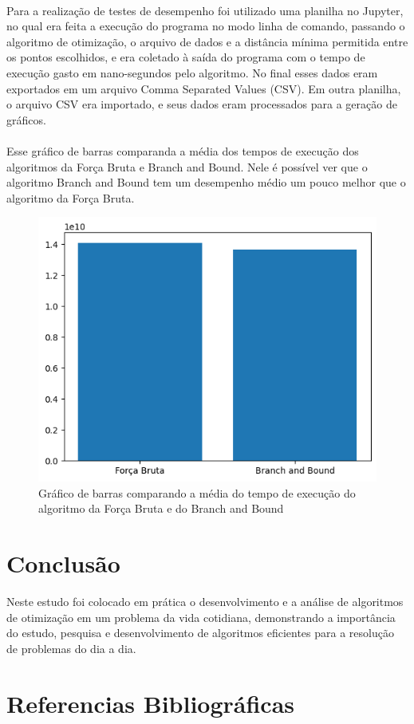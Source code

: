 \documentclass[12pt]{article}
\begin{document}
\paragraph{}Para a realização de testes de desempenho foi utilizado uma planilha no Jupyter, no qual era feita a execução do programa no modo linha de comando, passando o algoritmo de otimização, o arquivo de dados e a distância mínima permitida entre os pontos escolhidos, e era coletado à saída do programa com o tempo de execução gasto em nano-segundos pelo algoritmo. No final esses dados eram exportados em um arquivo Comma Separated Values (CSV). Em outra planilha, o arquivo CSV era importado, e seus dados eram processados para a geração de gráficos.

\paragraph{}Esse gráfico de barras comparanda a média dos tempos de execução dos algoritmos da Força Bruta e Branch and Bound. Nele é possível ver que o algoritmo Branch and Bound tem um desempenho médio um pouco melhor que o algoritmo da Força Bruta.

\begin{figure}
    \centering
    \includegraphics{comparacao.png}
    \caption{Gráfico de barras comparando a média do tempo de execução do algoritmo da Força Bruta e do Branch and Bound}
    \label{fig:fig-9}
\end{figure}

\section{Conclusão}

Neste estudo foi colocado em prática o desenvolvimento e a análise de algoritmos de otimização em um problema da vida cotidiana, demonstrando a importância do estudo, pesquisa e desenvolvimento de algoritmos eficientes para a resolução de problemas do dia a dia.

\section{Referencias Bibliográficas}



%
%
\end{document}
